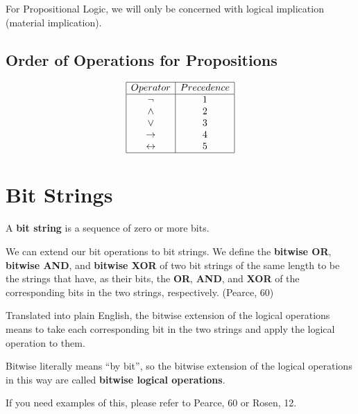 \documentclass[12pt]{article}
\begin{document}
For Propositional Logic, we will only be concerned with logical implication
(material implication).

\subsection{Order of Operations for Propositions}

\[
\begin{array}{|c|c|}
\hline
Operator & Precedence \\
\hline
\neg & 1 \\
\land & 2 \\
\lor & 3 \\
\to & 4 \\
\leftrightarrow & 5 \\
\hline
\end{array}
\]


\section{Bit Strings}

A \textbf{bit string} is a sequence of zero or more bits. 

We can extend our bit operations to bit strings. We define the 
\textbf{bitwise OR}, \textbf{bitwise AND}, and \textbf{bitwise XOR} of two bit
strings of the same length to be the strings that have, as their bits, the
\textbf{OR}, \textbf{AND}, and \textbf{XOR} of the corresponding bits in the
two strings, respectively. (Pearce, 60)

Translated into plain English, the bitwise extension of the logical operations
means to take each corresponding bit in the two strings and apply the logical
operation to them.

Bitwise literally means \enquote{by bit}, so the bitwise extension of the
logical operations in this way are called \textbf{bitwise logical operations}.

If you need examples of this, please refer to Pearce, 60 or Rosen, 12.
\end{document}
